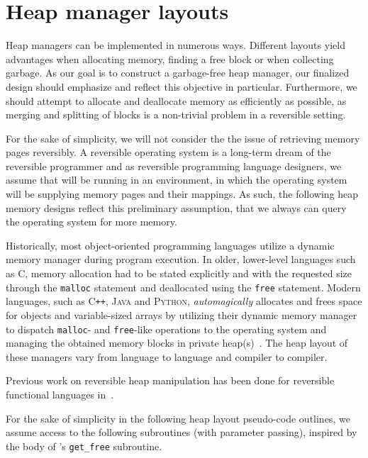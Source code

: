 \section{Heap manager layouts}
\label{sec:heap-manager-layout}
Heap managers can be implemented in numerous ways. Different layouts yield advantages when allocating memory, finding a free block or when collecting garbage. As our goal is to construct a garbage-free heap manager, our finalized design should emphasize and reflect this objective in particular. Furthermore, we should attempt to allocate and deallocate memory as efficiently as possible, as merging and splitting of blocks is a non-trivial problem in a reversible setting.

For the sake of simplicity, we will not consider the the issue of retrieving memory pages reversibly. A reversible operating system is a long-term dream of the reversible programmer and as reversible programming language designers, we assume that \rooplpp will be running in an environment, in which the operating system will be supplying memory pages and their mappings. As such, the following heap memory designs reflect this preliminary assumption, that we always can query the operating system for more memory. 

Historically, most object-oriented programming languages utilize a dynamic memory manager during program execution. In older, lower-level languages such as \textsc{C}, memory allocation had to be stated explicitly and with the requested size through the \texttt{malloc} statement and deallocated using the \texttt{free} statement. Modern languages, such as \textsc{C\texttt{++}}, \textsc{Java} and \textsc{Python}, \textit{automagically} allocates and frees space for objects and variable-sized arrays by utilizing their dynamic memory manager to dispatch \texttt{malloc}- and \texttt{free}-like operations to the operating system and managing the obtained memory blocks in private heap(s)~\cite{wh:cpp_memory, bv:jvm, py:memory}. The heap layout of these managers vary from language to language and compiler to compiler.

Previous work on reversible heap manipulation has been done for reversible functional languages in~\cite{ha:heap, jsk:translation, tm:garbage}.




For the sake of simplicity in the following heap layout pseudo-code outlines, we assume access to the following subroutines (with parameter passing), inspired by the body of \citeauthor{ha:heap}'s \texttt{get\_free} subroutine.

